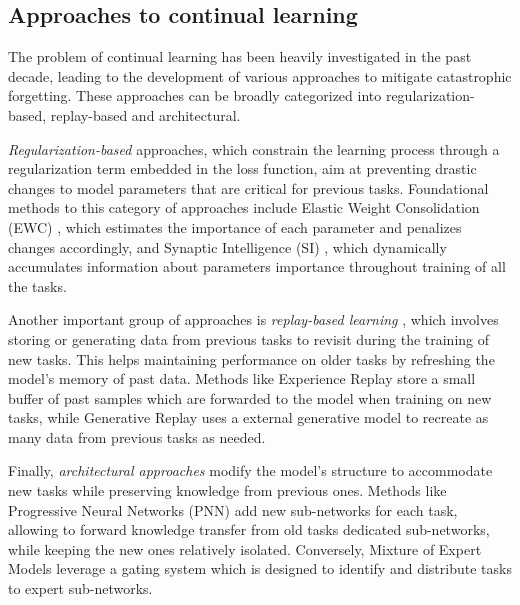 \documentclass[11pt]{article}
\begin{document}
\subsection{Approaches to continual learning}


The problem of continual learning has been heavily investigated in the past decade, leading to the development of various approaches to mitigate catastrophic forgetting. These approaches can be broadly categorized into regularization-based, replay-based and architectural.

\vspace{2mm}
\noindent
\textit{Regularization-based} approaches, which constrain the learning process through a regularization term embedded in the loss function, aim at preventing drastic changes to model parameters that are critical for previous tasks. Foundational methods to this category of approaches include Elastic Weight Consolidation (EWC) \cite{EWC_0}\cite{EWC_nuts_and_bolts}, which estimates the importance of each parameter and penalizes changes accordingly, and Synaptic Intelligence (SI) \cite{SI}, which dynamically accumulates information about parameters importance throughout training of all the tasks.

\vspace{2mm}
\noindent
Another important group of approaches is \textit{replay-based learning} \cite{replay_1}\cite{replay_2}\cite{replay_3}\cite{replay_4}\cite{replay_5_RtF}\cite{replay_6_GEM}\cite{replay_7_DGR}, which involves storing or generating data from previous tasks to revisit during the training of new tasks. This helps maintaining performance on older tasks by refreshing the model's memory of past data. Methods like Experience Replay \cite{replay_3} store a small buffer of past samples which are forwarded to the model when training on new tasks, while Generative Replay \cite{replay_2}\cite{replay_4}\cite{replay_5_RtF}\cite{replay_7_DGR} uses a external generative model to recreate as many data from previous tasks as needed. 

\vspace{2mm}
\noindent
Finally, \textit{architectural approaches} modify the model's structure to accommodate new tasks while preserving knowledge from previous ones. Methods like Progressive Neural Networks (PNN) \cite{PNN} add new sub-networks for each task, allowing to forward knowledge transfer from old tasks dedicated sub-networks, while keeping the new ones relatively isolated. Conversely, Mixture of Expert Models \cite{moe_1}\cite{moe_2} leverage a gating system which is designed to identify and distribute tasks to expert sub-networks.
\end{document}

